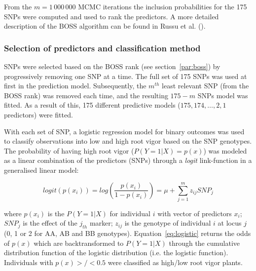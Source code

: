 From the $m=1\,000\,000$ MCMC iterations the inclusion probabilities for
the 175 SNPs were computed and used to rank the predictors.
A more detailed description of the BOSS algorithm can be found in Russu
et al. (\cite{russu2012stochastic}).



\subsubsection{Selection of predictors and classification method}
\label{par:predictor_selection}

SNPs were selected based on the BOSS rank (see section~\ref{par:boss})
by progressively removing one SNP at a time. The full set of 175 SNPs
was used at first in the prediction model. Subsequently, the $m^{th}$ least
relevant SNP (from the BOSS rank) was removed each time, and the
resulting $175-m$ SNPs model was fitted. As a result of this, 175
different predictive models ($175, 174, \ldots, 2, 1$ predictors) were fitted.

With each set of SNP, a logistic regression model for binary outcomes
was used to classify observations into low and high root vigor based on
the SNP genotypes. The probability of having high root vigor ($P(Y=1|X)=p(x)$) was modeled as a linear
combination of the predictors (SNPs) through a \emph{logit}
link-function in a generalised linear model:

\begin{equation} \label{eq:logistic}
logit(p(x_i)) = log \left ( \frac{p(x_i)}{1-p(x_i)} \right ) = \mu +
\sum_{j=1}^m z_{ij} SNP_j
\end{equation}
 
where $p(x_i)$ is the $P(Y=1|X)$ for individual $i$ with vector of
predictors $x_i$; $SNP_j$ is the effect of the $j_{th}$ marker; $z_{ij}$
is the genotype of individual $i$ at locus $j$ (0, 1 or 2 for AA, AB and
BB genotypes).
Equation~\ref{eq:logistic} returns the odds of $p(x)$ which are
backtransformed to $P(Y=1|X)$ through the cumulative
distribution function of the logistic distribution (i.e. the logistic
function). Individuals with $p(x)>/<0.5$ were classified as high/low
root vigor plants.

